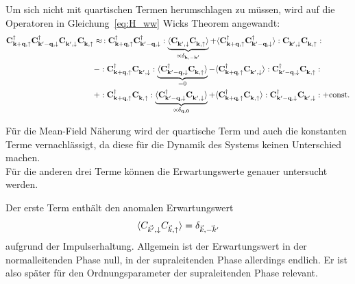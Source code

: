 Um sich nicht mit quartischen Termen herumschlagen zu müssen, wird auf die Operatoren in Gleichung~\eqref{eq:H_ww} Wicks Theorem angewandt:
\begin{align*}
    \ocdu \ocdd \ocndd \ocndu &\approx \, :\ocdu \ocdd : \underbrace{\expval{\ocndd \ocndu}}_{\propto \delta_{\mb{k}, -\mb{k'}}} + \expval{\ocdu \ocdd} : \ocndd \ocndu :\\
    &- : \ocdu \ocndd : \underbrace{\expval{\ocdd \ocndu}}_{= 0} - \expval{\ocdu \ocndd} : \ocdd \ocndu : \\
    &+ : \ocdu \ocndu : \underbrace{\expval{\ocdd \ocndd}}_{\propto \delta_{\mb{q}, \mb{0}}} + \expval{\ocdu \ocndu} : \ocdd \ocndd : + \text{const.}
\end{align*}

Für die Mean-Field Näherung wird der quartische Term und auch die konstanten Terme vernachlässigt, da diese für die Dynamik des Systems keinen Unterschied machen. \\
Für die anderen drei Terme können die Erwartungswerte genauer untersucht werden.

Der erste Term enthält den anomalen Erwartungswert 
\begin{equation}
    \langle C_{\vec{k'}, \downarrow} C_{\vec{k}, \uparrow}\rangle = \delta_{\vec{k},\vec{-k'}}
\end{equation}
aufgrund der Impulserhaltung. Allgemein ist der Erwartungswert in der normalleitenden Phase null, in der supraleitenden Phase allerdings endlich. Er ist also später für den Ordnungsparameter der supraleitenden Phase relevant.

